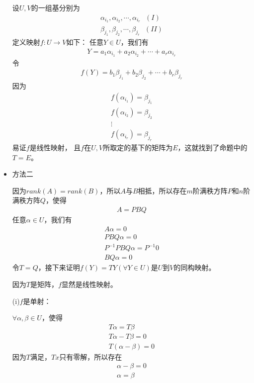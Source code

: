 \documentclass{article}
\begin{document}
\begin{itemize}
        设$U,V$的一组基分别为
        \begin{align*}
          \alpha_{i_1}, \alpha_{i_2}, \cdots, \alpha_{i_r} \ \ \ (I) \\
          \beta_{j_1}, \beta_{j_2}, \cdots, \beta_{j_r} \ \ \ (II)
        \end{align*}
        定义映射$f: U \to V$如下：
        任意$Y \in U$，我们有
        \begin{align*}
          Y = a_1 \alpha_{i_1} + a_2 \alpha_{i_2} + \cdots + a_r \alpha_{i_r}
        \end{align*}
        令
        \begin{align*}
          f(Y) = b_1 \beta_{j_1} + b_2 \beta_{j_2} + \cdots + b_r \beta_{j_r}
        \end{align*}
        因为
        \begin{align*}
          f(\alpha_{i_1}) = \beta_{j_1} \\
          f(\alpha_{i_2}) = \beta_{j_2} \\
          \vdots                        \\
          f(\alpha_{i_r}) = \beta_{j_r}
        \end{align*}
        易证$f$是线性映射，
        且$f$在$U,V$所取定的基下的矩阵为$E$，这就找到了命题中的$T = E$。

  \item 方法二

        因为$rank(A) = rank(B)$，所以$A$与$B$相抵，所以存在$m$阶满秩方阵$P$和$n$阶满秩方阵$Q$，使得
        \begin{align*}
          A = PBQ
        \end{align*}
        任意$\alpha \in U$，我们有
        \begin{align*}
          A \alpha = 0                \\
          PBQ \alpha = 0              \\
          P^{-1} PBQ \alpha = P^{-1}0 \\
          BQ \alpha = 0
        \end{align*}
        令$T = Q$，接下来证明$f(Y) = TY (\forall Y \in U)$是$U$到$V$的同构映射。

        因为$T$是矩阵，$f$显然是线性映射。

        (i)$f$是单射：

        $\forall \alpha, \beta \in U$，使得
        \begin{align*}
          T \alpha = T \beta     \\
          T \alpha - T \beta = 0 \\
          T (\alpha - \beta) = 0
        \end{align*}
        因为$T$满足，$Tx$只有零解，所以存在
        \begin{align*}
          \alpha - \beta = 0 \\
          \alpha = \beta
        \end{align*}


\end{itemize}
\end{document}
